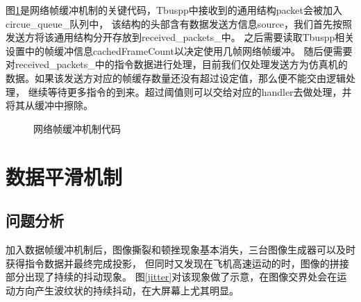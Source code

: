\par
图\ref{framebuf}是网络帧缓冲机制的关键代码，Tbuspp中接收到的通用结构packet会被加入circue\_queue\_队列中，
该结构的头部含有数据发送方信息source，我们首先按照发送方将该通用结构分开存放到received\_packets\_中。
之后需要读取Tbuspp相关设置中的帧缓冲信息cachedFrameCount以决定使用几帧网络帧缓冲。
随后便需要对received\_packets\_中的指令数据进行处理，目前我们仅处理发送方为仿真机的数据。如果该发送方对应的帧缓存数量还没有超过设定值，那么便不能交由逻辑处理，
继续等待更多指令的到来。超过阈值则可以交给对应的handler去做处理，并将其从缓冲中擦除。
\clearpage  
\begin{figure}[h!]
    \centering
     
    \caption{网络帧缓冲机制代码}
    \label{framebuf}
\end{figure}

\section{数据平滑机制}
\subsection{问题分析}
加入数据帧缓冲机制后，图像撕裂和顿挫现象基本消失，三台图像生成器可以及时获得指令数据并最终完成投影，
但同时又发现在飞机高速运动的时，图像的拼接部分出现了持续的抖动现象。
图\ref{jitter}对该现象做了示意，在图像交界处会在运动方向产生波纹状的持续抖动，在大屏幕上尤其明显。

